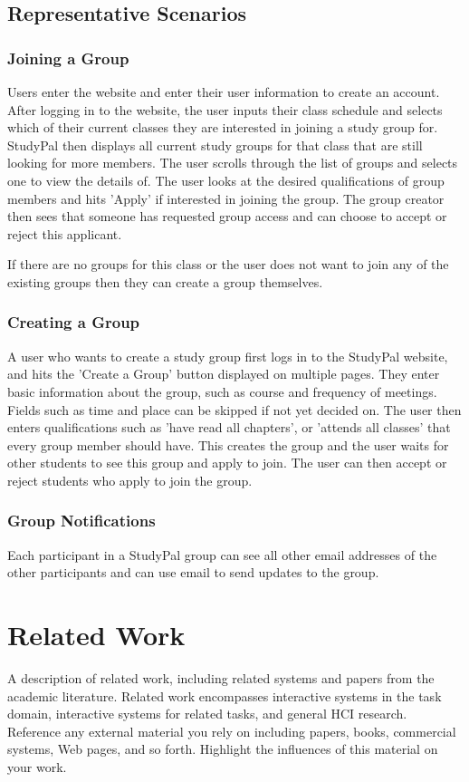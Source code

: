 \documentclass[conference]{IEEEtran}
\begin{document}
\subsection{Representative Scenarios}

\subsubsection{Joining a Group}
Users enter the website and enter their user information to create an account.
After logging in to the website, the user inputs their class schedule and selects which of their current classes they are interested in joining a study group for.
StudyPal then displays all current study groups for that class that are still looking for more members.
The user scrolls through the list of groups and selects one to view the details of.
The user looks at the desired qualifications of group members and hits 'Apply' if interested in joining the group.
The group creator then sees that someone has requested group access and can choose to accept or reject this applicant.

If there are no groups for this class or the user does not want to join any of the existing groups then they can create a group themselves.

\subsubsection{Creating a Group}
A user who wants to create a study group first logs in to the StudyPal website, and hits the 'Create a Group' button displayed on multiple pages.
They enter basic information about the group, such as course and frequency of meetings.
Fields such as time and place can be skipped if not yet decided on.
The user then enters qualifications such as 'have read all chapters', or 'attends all classes' that every group member should have.
This creates the group and the user waits for other students to see this group and apply to join.
The user can then accept or reject students who apply to join the group.

\subsubsection{Group Notifications}
Each participant in a StudyPal group can see all other email addresses of the other participants and can use email to send updates to the group.



\section{Related Work}
A description of related work, including related systems and papers from the academic literature. Related work encompasses interactive systems in the task domain, interactive systems for related tasks, and general HCI research. Reference any external material you rely on including papers, books, commercial systems, Web pages, and so forth. Highlight the influences of this material on your work. 
\end{document}
